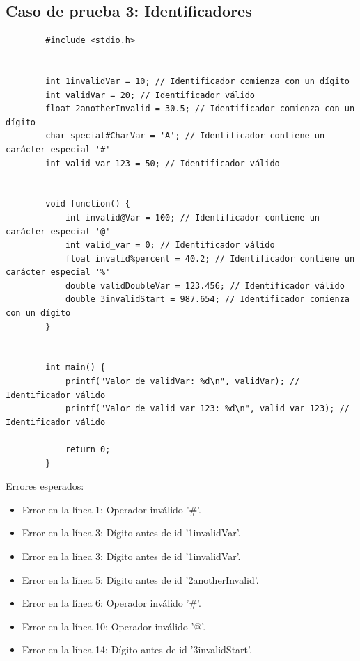 \documentclass[a4paper,12pt]{article}
\begin{document}
\begin{flushleft}
\begin{verbatim}
\end{verbatim}
\end{flushleft}

\newpage

\subsection*{Caso de prueba 3: Identificadores}
\begin{flushleft}
	\begin{verbatim}
		#include <stdio.h>
		
		
		int 1invalidVar = 10; // Identificador comienza con un dígito
		int validVar = 20; // Identificador válido
		float 2anotherInvalid = 30.5; // Identificador comienza con un dígito
		char special#CharVar = 'A'; // Identificador contiene un carácter especial '#'
		int valid_var_123 = 50; // Identificador válido
		
		
		void function() {
			int invalid@Var = 100; // Identificador contiene un carácter especial '@'
			int valid_var = 0; // Identificador válido
			float invalid%percent = 40.2; // Identificador contiene un carácter especial '%'
			double validDoubleVar = 123.456; // Identificador válido
			double 3invalidStart = 987.654; // Identificador comienza con un dígito
		}
		
		
		int main() {
			printf("Valor de validVar: %d\n", validVar); // Identificador válido
			printf("Valor de valid_var_123: %d\n", valid_var_123); // Identificador válido
			
			return 0;
		}
	\end{verbatim}
	Errores esperados:
	\begin{itemize}
		\item Error en la línea 1: Operador inválido '\#'.
		\item Error en la línea 3: Dígito antes de id '1invalidVar'.
		\item Error en la línea 3: Dígito antes de id '1invalidVar'.
		\item Error en la línea 5: Dígito antes de id '2anotherInvalid'.
		\item Error en la línea 6: Operador inválido '\#'.
		\item Error en la línea 10: Operador inválido '@'.
		\item Error en la línea 14: Dígito antes de id '3invalidStart'.
	\end{itemize}
	

\end{flushleft}
\end{document}
